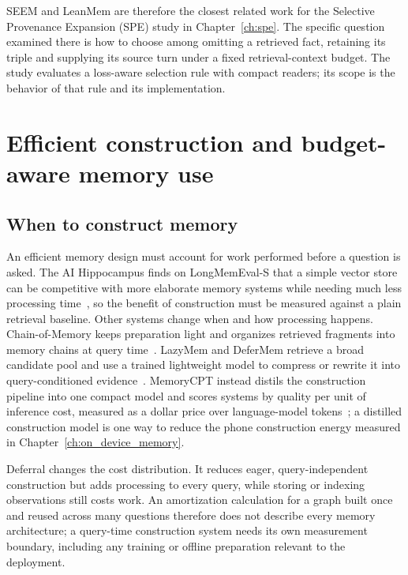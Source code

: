 SEEM and LeanMem are therefore the closest related work for the Selective Provenance
Expansion (SPE) study in Chapter~\ref{ch:spe}. The specific question examined there is how
to choose among omitting a retrieved fact, retaining its triple and supplying its source
turn under a fixed retrieval-context budget. The study evaluates a loss-aware selection
rule with compact readers; its scope is the behavior of that rule and its implementation.

\section{Efficient construction and budget-aware memory use}
\label{sec:ch2_budgets}

\subsection{When to construct memory}

An efficient memory design must account for work performed before a question is asked. The AI
Hippocampus finds on LongMemEval-S that a simple vector store can be competitive with more
elaborate memory systems while needing much less processing time~\citep{ai_hippocampus}, so the
benefit of construction must be measured against a plain retrieval baseline. Other systems change
when and how processing happens. Chain-of-Memory keeps preparation light and organizes retrieved
fragments into memory chains at query time~\citep{chain_of_memory}. LazyMem and DeferMem retrieve a
broad candidate pool and use a trained lightweight model to compress or rewrite it into
query-conditioned evidence~\citep{lazymem,defermem}. MemoryCPT instead distils the construction
pipeline into one compact model and scores systems by quality per unit of inference cost, measured
as a dollar price over language-model tokens~\citep{memorycpt}; a distilled construction model is
one way to reduce the phone construction energy measured in Chapter~\ref{ch:on_device_memory}.

Deferral changes the cost distribution. It reduces eager, query-independent construction but adds
processing to every query, while storing or indexing observations still costs work. An amortization
calculation for a graph built once and reused across many questions therefore does not describe
every memory architecture; a query-time construction system needs its own measurement boundary,
including any training or offline preparation relevant to the deployment.

